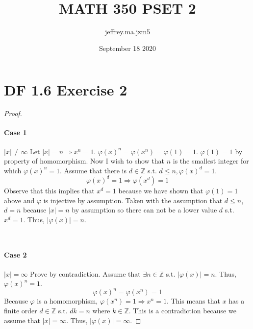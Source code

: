 \documentclass{article}
\title{MATH 350 PSET 2}
\author{jeffrey.ma.jzm5 }
\date{September 18 2020}
\begin{document}
\maketitle

\section{DF 1.6 Exercise 2}
\begin{proof}

~\paragraph{Case 1} 
$|x| \neq \infty$
\newline
\indent Let $|x|=n \Rightarrow x^n = 1$.
$\varphi(x)^n=\varphi(x^n)=\varphi(1)=1$.
$\varphi(1)=1$ by property of homomorphism.
\newline
\indent Now I wish to show that $n$ is the smallest integer for which $\varphi(x)^n = 1$. Assume that there is $d \in \mathbb{Z}$ s.t. $d \leq n, \varphi(x)^d = 1$.
\[
\varphi(x)^d = 1 \Rightarrow \varphi(x^d) = 1
\]
Observe that this implies that $x^d = 1$ because we have shown that $\varphi(1) = 1$ above and $\varphi$ is injective by assumption. Taken with the assumption that $d \leq n$, $d = n$ because $|x|=n$ by assumption so there can not be a lower value $d$ s.t. $x^d = 1$. Thus, $|\varphi(x)|=n$.

~\paragraph{Case 2}
$|x| = \infty$
\newline
\indent Prove by contradiction. Assume that $\exists n \in \mathbb{Z}$ s.t. $|\varphi(x)|=n$. Thus, $\varphi(x)^n=1$. 
\[
\varphi(x)^n = \varphi(x^n) = 1
\]
Because $\varphi$ is a homomorphism, $\varphi(x^n)=1 \Rightarrow x^n=1$. This means that $x$ has a finite order $d \in \mathbb{Z}$ s.t. $dk=n$ where $k \in \mathbb{Z}$. This is a contradiction because we assume that $|x|=\infty$. Thus, $|\varphi(x)|=\infty$.


\end{proof}
\end{document}
